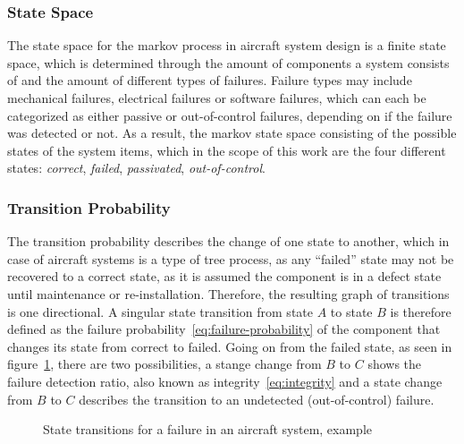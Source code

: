 \subsubsection{State Space}\label{subsubsec:state-space}
The state space for the markov process in aircraft system design is a finite state space, which is determined through the amount of components
a system consists of and the amount of different types of failures.
Failure types may include mechanical failures, electrical failures or software failures, which can each be categorized as either
passive or out-of-control failures, depending on if the failure was detected or not.
As a result, the markov state space consisting of the possible states of the system items, which in the scope of
this work are the four different states: \textit{correct}, \textit{failed}, \textit{passivated}, \textit{out-of-control}.

\subsubsection{Transition Probability}\label{subsubsec:transition-probability}
The transition probability describes the change of one state to another, which in case of aircraft systems is a type of tree
process, as any ``failed'' state may not be recovered to a correct state, as it is assumed the component is in a defect state until
maintenance or re-installation.
Therefore, the resulting graph of transitions is one directional.
A singular state transition from state $A$ to state $B$ is therefore defined as the failure probability~\ref{eq:failure-probability}
of the component that changes its state
from correct to failed.
Going on from the failed state, as seen in figure~\ref{fig:state-change}, there are two possibilities,
a stange change from $B$ to $C$ shows the failure detection ratio, also known as integrity~\ref{eq:integrity}
and a state change from $B$ to $C$ describes the transition to an undetected (out-of-control) failure.
\begin{figure}
    \begin{center}
    \end{center}
    \caption{State transitions for a failure in an aircraft system, example}
    \label{fig:state-change}
\end{figure}
